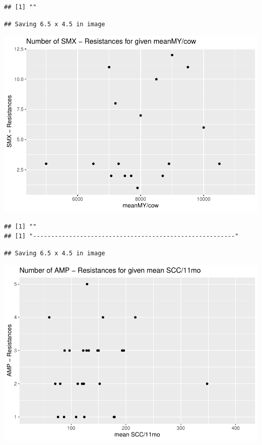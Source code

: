 \documentclass[
]{article}
\begin{document}
\begin{verbatim}
## [1] ""
\end{verbatim}

\begin{verbatim}
## Saving 6.5 x 4.5 in image
\end{verbatim}

\includegraphics{NResistenzen_files/figure-latex/numerical_variables-10.pdf}

\begin{verbatim}
## [1] ""
## [1] "--------------------------------------------------------"
\end{verbatim}

\begin{verbatim}
## Saving 6.5 x 4.5 in image
\end{verbatim}

\includegraphics{NResistenzen_files/figure-latex/numerical_variables-11.pdf}
\end{document}
